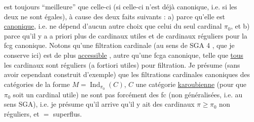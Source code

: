 est toujours ``meilleure'' que celle-ci (si celle-ci
 n'est  déjà canonique, i.e. si les
deux ne sont égales), à cause des deux
faits suivants : a)  parce qu'elle est \uline{canonique},
i.e. ne dépend d'aucun autre choix que
celui du seul cardinal $\pi_0$, et b) parce
qu'il y a a priori plus de cardinaux
utiles et de cardinaux réguliers pour
la fcg canonique. 
Notons qu'une filtration cardinale (au sens
de SGA 4 , que je conserve ici)  est de plus
\uline{accessible} ,  autre qu'une 
fcga canonique, telle que \uline{tous} les
cardinaux sont réguliers (a fortiori utiles)
pour  filtration. Je présume 
(sans avoir cependant construit d'exemple)
que les filtrations cardinales canoniques
des catégories de la forme $M=\operatorname{Ind}_{\pi_0}(C)$,
$C$ une  catégorie \uline{karoubienne} (pour
que $\pi_0$ soit un cardinal utile) 
ne sont pas forcément des fc (non généralisées, i.e. au sens SGA), i.e. je présume
qu'il arrive qu'il y ait des cardinaux $\pi\geq\pi_0$
non réguliers, et $=$ superflus.

